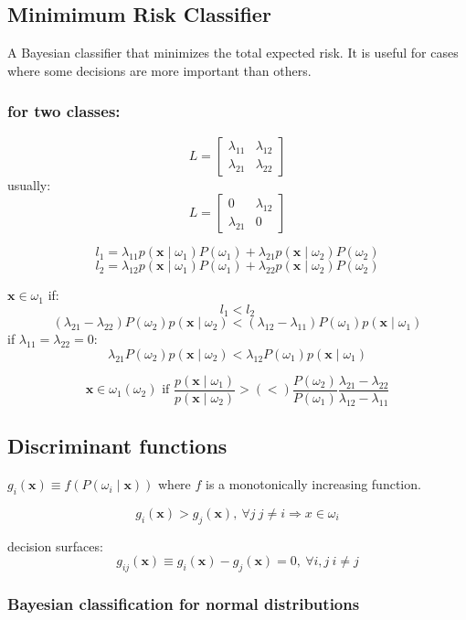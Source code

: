 \documentclass{article}
\begin{document}
\begin{multicols}{2}
\subsection{Minimimum Risk Classifier}
A Bayesian classifier that minimizes the total expected risk. It is useful for cases where some decisions are more important than others.

\subsubsection*{for two classes:}
\[L = \begin{bmatrix}
	\lambda_{11} & \lambda_{12} \\
	\lambda_{21} & \lambda_{22}
\end{bmatrix}\]
usually:
\[L = \begin{bmatrix}
	0 & \lambda_{12} \\
	\lambda_{21} & 0
\end{bmatrix}\]

\[l_1 = \lambda_{11} p(\symbf{x} \mid \omega_1)P(\omega_1) + \lambda_{21} p(\symbf{x} \mid \omega_2)P(\omega_2)\]
\[l_2 = \lambda_{12} p(\symbf{x} \mid \omega_1)P(\omega_1) + \lambda_{22} p(\symbf{x} \mid \omega_2)P(\omega_2)\]

$\symbf{x} \in \omega_1$ if:
\[l_1 < l_2\]
\[(\lambda_{21}-\lambda_{22}) P(\omega_2) p(\symbf{x} \mid \omega_2) < (\lambda_{12}-\lambda_{11}) P(\omega_1) p(\symbf{x} \mid \omega_1)\]
if $\lambda_{11} = \lambda_{22} = 0$:
\[\lambda_{21} P(\omega_2) p(\symbf{x} \mid \omega_2) < \lambda_{12} P(\omega_1) p(\symbf{x} \mid \omega_1)\]

\[\symbf{x} \in \omega_1 (\omega_2) \text{ if } \frac{p(\symbf{x} \mid \omega_1)}{p(\symbf{x} \mid \omega_2)} > (<) \frac{P(\omega_2)}{P(\omega_1)}\frac{\lambda_{21}-\lambda_{22}}{\lambda_{12}-\lambda_{11}}\]

\subsection{Discriminant functions}
$g_i (\symbf{x}) \equiv f(P(\omega_i \mid \symbf{x}))$ where $f$ is a monotonically increasing function.

\[g_i(\symbf{x}) > g_j(\symbf{x}),\ \forall j\ j \neq i \Rightarrow x \in \omega_i\]

decision surfaces:
\[g_{ij}(\symbf{x}) \equiv g_i(\symbf{x}) - g_j(\symbf{x}) = 0,\ \forall i, j\ i \neq j\]

\subsubsection*{Bayesian classification for normal distributions}


\end{multicols}
\end{document}
